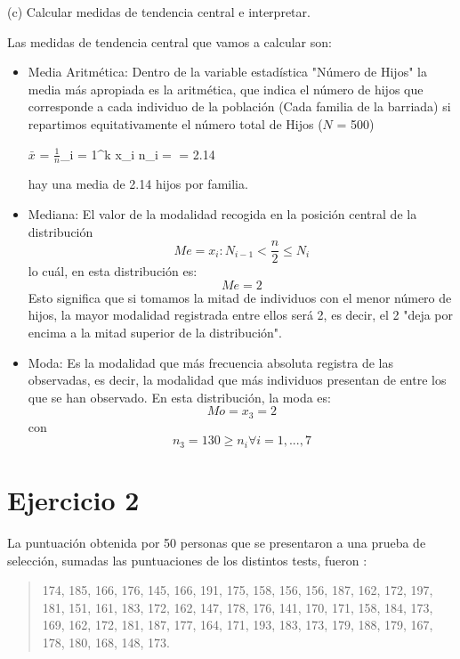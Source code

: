 \documentclass[a4paper,12pt]{article}
\begin{document}
(c) Calcular medidas de tendencia central e interpretar.

Las medidas de tendencia central que vamos a calcular son:
\begin{itemize}
    \item Media Aritmética: Dentro de la variable estadística "Número de Hijos" la media más apropiada es la aritmética, que indica el número de hijos que corresponde a cada individuo de la población (Cada familia de la barriada) si repartimos equitativamente el número total de Hijos ($N$ = 500)
\begin{center} 
    $\bar x$ = $\frac {1}{n} $\sum\limits_{i = 1}^k {x_i n_i}$ = $ = 2.14
    
\end{center}
hay una media de 2.14 hijos por familia.

    \item Mediana: El valor de la modalidad recogida en la posición central de la distribución
    $$Me = x_i : N_{i-1} < \frac {n}{2} \leq N_i$$
    lo cuál, en esta distribución es: $$Me = 2$$
    Esto significa que si tomamos la mitad de individuos con el menor número de hijos, la mayor modalidad registrada entre ellos será 2, es decir, el 2 "deja por encima a la mitad superior de la distribución".

    \item Moda: Es la modalidad que más frecuencia absoluta registra de las observadas, es decir, la modalidad que más individuos presentan de entre los que se han observado. En esta distribución, la moda es:
    $$Mo = x_3 = 2$$ con $$n_3 = 130 \geq n_i \forall i = 1,...,7$$
\end{itemize}


\section*{Ejercicio 2} La puntuación obtenida por 50 personas que se presentaron a una prueba de selección, sumadas las puntuaciones de los distintos tests, fueron :

\begin{quote}
174, 185, 166, 176, 145, 166, 191, 175, 158, 156, 156, 187, 162, 172, 197, 181, 151, 161, 183, 172, 162, 147, 178, 176, 141, 170, 171, 158, 184, 173, 169, 162, 172, 181, 187, 177, 164, 171, 193, 183, 173, 179, 188, 179, 167, 178, 180, 168, 148, 173.
\end{quote}
\end{document}
